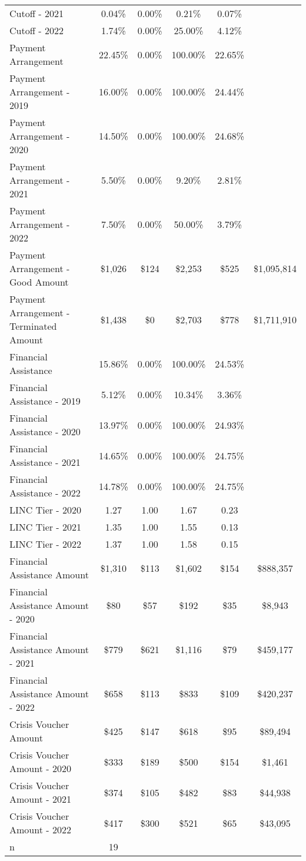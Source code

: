 \begin{tabular}{l|c|c|c|c|c}
\quad Cutoff - 2021 & 0.04\% & 0.00\% & 0.21\% & 0.07\% \\
\quad Cutoff - 2022 & 1.74\% & 0.00\% & 25.00\% & 4.12\% \\
\midrule 
Payment Arrangement & 22.45\% & 0.00\% & 100.00\% & 22.65\% \\
\quad Payment Arrangement - 2019 & 16.00\% & 0.00\% & 100.00\% & 24.44\% \\
\quad Payment Arrangement - 2020 & 14.50\% & 0.00\% & 100.00\% & 24.68\% \\
\quad Payment Arrangement - 2021 & 5.50\% & 0.00\% & 9.20\% & 2.81\% \\
\quad Payment Arrangement - 2022 & 7.50\% & 0.00\% & 50.00\% & 3.79\% \\
\quad Payment Arrangement - Good Amount & \$1,026 & \$124 & \$2,253 & \$525 & \$1,095,814 \\
\quad Payment Arrangement - Terminated Amount & \$1,438 & \$0 & \$2,703 & \$778 & \$1,711,910 \\
\midrule 
Financial Assistance & 15.86\% & 0.00\% & 100.00\% & 24.53\% \\
\quad Financial Assistance - 2019 & 5.12\% & 0.00\% & 10.34\% & 3.36\% \\
\quad Financial Assistance - 2020 & 13.97\% & 0.00\% & 100.00\% & 24.93\% \\
\quad Financial Assistance - 2021 & 14.65\% & 0.00\% & 100.00\% & 24.75\% \\
\quad Financial Assistance - 2022 & 14.78\% & 0.00\% & 100.00\% & 24.75\% \\
\midrule 
LINC Tier - 2020 & 1.27 & 1.00 & 1.67 & 0.23 \\
LINC Tier - 2021 & 1.35 & 1.00 & 1.55 & 0.13 \\
LINC Tier - 2022 & 1.37 & 1.00 & 1.58 & 0.15 \\
\midrule 
Financial Assistance Amount & \$1,310 & \$113 & \$1,602 & \$154 & \$888,357 \\
\quad Financial Assistance Amount - 2020 & \$80 & \$57 & \$192 & \$35 & \$8,943 \\
\quad Financial Assistance Amount - 2021 & \$779 & \$621 & \$1,116 & \$79 & \$459,177 \\
\quad Financial Assistance Amount - 2022 & \$658 & \$113 & \$833 & \$109 & \$420,237 \\
\midrule 
Crisis Voucher Amount & \$425 & \$147 & \$618 & \$95 & \$89,494 \\
\quad Crisis Voucher Amount - 2020 & \$333 & \$189 & \$500 & \$154 & \$1,461 \\
\quad Crisis Voucher Amount - 2021 & \$374 & \$105 & \$482 & \$83 & \$44,938 \\
\quad Crisis Voucher Amount - 2022 & \$417 & \$300 & \$521 & \$65 & \$43,095 \\
\midrule 
n & 19 &  &  &  &  \\
\midrule 
\bottomrule 
\end{tabular}
